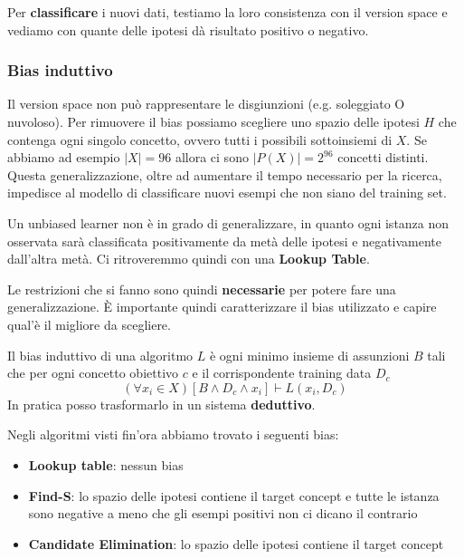 Per \textbf{classificare} i nuovi dati, testiamo la loro consistenza con il version space e vediamo con quante delle ipotesi dà risultato positivo o negativo.

\subsubsection{Bias induttivo}
Il version space non può rappresentare le disgiunzioni (e.g. soleggiato O nuvoloso). Per rimuovere il bias possiamo scegliere uno spazio delle ipotesi $H$ che contenga ogni singolo concetto, ovvero tutti i possibili sottoinsiemi di $X$. Se abbiamo ad esempio $\lvert X \rvert=96$ allora ci sono $\lvert P(X)\rvert = 2^{96}$ concetti distinti. \\
Questa generalizzazione, oltre ad aumentare il tempo necessario per la ricerca, impedisce al modello di classificare nuovi esempi che non siano del training set.
\begin{definition}
	Un unbiased learner non è in grado di generalizzare, in quanto ogni istanza non osservata sarà classificata positivamente da metà delle ipotesi e negativamente dall'altra metà. Ci ritroveremmo quindi con una \textbf{Lookup Table}.
\end{definition}
\noindent Le restrizioni che si fanno sono quindi \textbf{necessarie} per potere fare una generalizzazione. È importante quindi caratterizzare il bias utilizzato e capire qual'è il migliore da scegliere.

\begin{definition}
	Il bias induttivo di una algoritmo $L$ è ogni minimo insieme di assunzioni $B$ tali che per ogni concetto obiettivo $c$ e il corrispondente training data $D_c$
	\begin{equation}
		(\forall x_i \in X)[B \land D_c \land x_i] \vdash L(x_i, D_c)
	\end{equation}
	In pratica posso trasformarlo in un sistema \textbf{deduttivo}.
\end{definition}
Negli algoritmi visti fin'ora abbiamo trovato i seguenti bias:
\begin{itemize}
	\item \textbf{Lookup table}: nessun bias
	\item \textbf{Find-S}: lo spazio delle ipotesi contiene il target concept e tutte le istanza sono negative a meno che gli esempi positivi non ci dicano il contrario
	\item \textbf{Candidate Elimination}: lo spazio delle ipotesi contiene il target concept
\end{itemize}